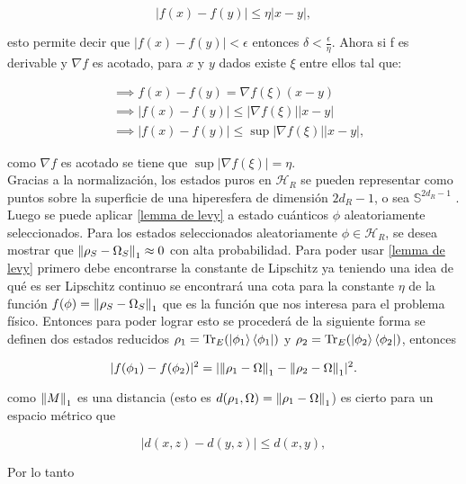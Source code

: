 \begin{equation}
|f(x) -f(y)| \leq \eta |x-y|,
\end{equation}

esto permite decir que  $|f(x)-f(y)| < \epsilon $ entonces $\delta < \frac{\epsilon}{\eta} $. Ahora si f es derivable y $\nabla f$ es acotado, para $x$ y $y$ dados existe $\xi$ entre ellos tal que:


\begin{align}
&\implies f(x)-f(y) = \nabla f(\xi) (x-y) \\
&\implies |f(x)- f(y)| \le |\nabla f(\xi)| |x-y| \\
&\implies |f(x)- f(y)| 	\le \sup|\nabla f(\xi)| |x-y|,
\end{align}

como $\nabla f$ es acotado se tiene que $\sup |\nabla f(\xi)|=\eta$.\\

Gracias a la normalización, los estados puros en $\mathcal{H}_{R}$ se pueden representar como puntos sobre la superficie de una hiperesfera de dimensión $2d_{R}-1$, o sea  $\mathbb{S}^{2d_{R}-1}$ \cite{SakuraiQuantum}. Luego se puede aplicar \ref{lemma de levy} a estado cuánticos $\phi$ aleatoriamente seleccionados. Para los estados seleccionados aleatoriamente $\phi \in \mathcal{H}_{R}$, se desea mostrar que $\norm{\rho_{S}- \Omega_{S}}_{1} \approx 0$ con alta probabilidad. Para poder usar \ref{lemma de levy} primero  debe encontrarse la constante de Lipschitz ya teniendo una idea de qué es ser Lipschitz continuo se encontrará una cota para la constante $\eta$ de la función $f(\phi)=\norm{\rho_{S}-\Omega_{S}}_{1}$ que es la función que nos interesa para el problema físico. Entonces para poder lograr esto se procederá de la siguiente forma se definen dos estados reducidos $\rho_{1}= \Tr_{E} (\ket{\phi_{1}} \bra{\phi_{1}})$ y $\rho_{2}= \Tr_{E}(\ket{\phi_{2}} \bra{\phi_{2}})$, entonces

\begin{equation}
|f(\phi_{1})-f(\phi_{2})|^2= |\norm{\rho_{1}-\Omega}_{1} - \norm{\rho_{2}-\Omega}_{1}|^2.
\end{equation}

como $\norm{M}_{1}$ es una distancia (esto es $d(\rho_{1},\Omega)= \norm{\rho_{1}-\Omega}_{1}$) es cierto para un espacio métrico que

\begin{equation}
|d(x,z)-d(y,z)| \le d(x,y),
\end{equation}

Por lo tanto 

